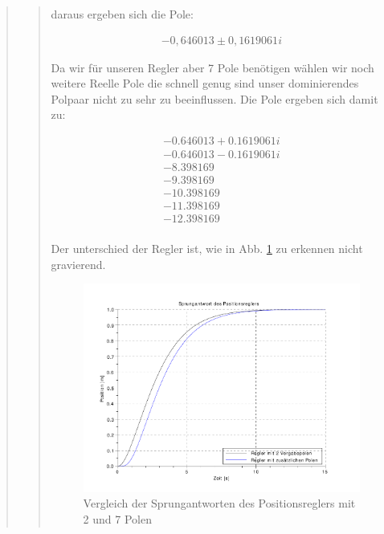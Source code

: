 \begin{quote}
\begin{quote}
        daraus ergeben sich die Pole:
        
        \begin{equation}
        \begin{split}
             - 0,646013 \pm 0,1619061i
        \end{split}
        \end{equation}
        
        Da wir für unseren Regler aber 7 Pole benötigen wählen wir noch weitere Reelle Pole die schnell genug sind unser
        dominierendes Polpaar nicht zu sehr zu beeinflussen. Die Pole ergeben sich damit zu:
        
        \begin{equation*}
        \begin{split}
            - 0.646013 + 0.1619061i\\
            - 0.646013 - 0.1619061i\\
            - 8.398169\\
            - 9.398169\\
            - 10.398169\\
            - 11.398169\\
            - 12.398169\\
        \end{split}
        \end{equation*}
        
        
        Der unterschied der Regler ist, wie in Abb. \ref{fig:positionsregler_vergleich} zu erkennen nicht gravierend.
        
        \begin{figure}[H]
        \centering
            \includegraphics[scale=0.7, trim = 0cm 0cm 0cm 0cm, clip]{Bilder/positionsregler_vergleich}
                \caption{Vergleich der Sprungantworten des Positionsreglers mit 2 und 7 Polen}
                \label{fig:positionsregler_vergleich}
        \end{figure}
        

\end{quote}
\end{quote}
